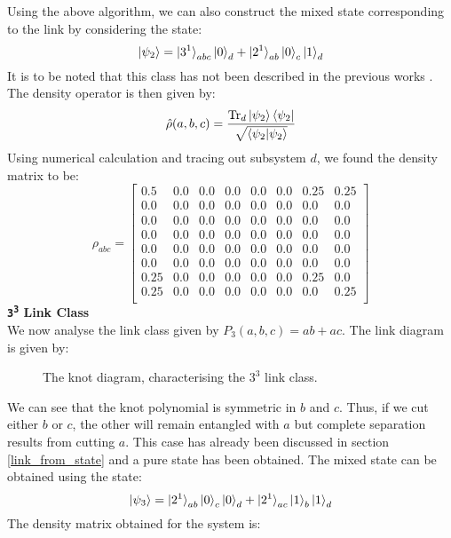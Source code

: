 \documentclass{scrartcl}
\begin{document}
Using the above algorithm, we can also construct the mixed state corresponding to the link by considering the state:
$$\ket{\psi_2} = \ket{3^1}_{abc}\ket{0}_d + \ket{2^1}_{ab}\ket{0}_c\ket{1}_d$$
It is to be noted that this class has not been described in the previous works \cite{Aravind1997,Sugita2007-ko}. The density operator is then given by:
$$\hat{\rho}(a,b,c) = \frac{\Tr_d\ket{\psi_2}\bra{\psi_2}}{\sqrt{\braket{\psi_2|\psi_2}}} $$
Using numerical calculation and tracing out subsystem $d$, we found the density matrix to be:
\begin{equation}
    \rho_{abc}=
    \left[
    \begin{array}{cccccccc}
    0.5 & 0.0 & 0.0 & 0.0 & 0.0 & 0.0 & 0.25 & 0.25 \\
    0.0 & 0.0 & 0.0 & 0.0 & 0.0 & 0.0 & 0.0 & 0.0 \\
    0.0 & 0.0 & 0.0 & 0.0 & 0.0 & 0.0 & 0.0 & 0.0 \\
    0.0 & 0.0 & 0.0 & 0.0 & 0.0 & 0.0 & 0.0 & 0.0 \\
    0.0 & 0.0 & 0.0 & 0.0 & 0.0 & 0.0 & 0.0 & 0.0 \\
    0.0 & 0.0 & 0.0 & 0.0 & 0.0 & 0.0 & 0.0 & 0.0 \\
    0.25 & 0.0 & 0.0 & 0.0 & 0.0 & 0.0 & 0.25 & 0.0 \\
    0.25 & 0.0 & 0.0 & 0.0 & 0.0 & 0.0 & 0.0 & 0.25 \\
    \end{array}
    \right]
    \end{equation}
\textbf{\large \texttt{3\textsuperscript{3}} Link Class} \\[0.3cm]
We now analyse the link class given by $P_3(a,b,c) = ab+ac$. The link diagram is given by:
\begin{figure}[H]
    \centering
    
  \caption{The knot diagram, characterising the $3^3$ link class.}
\end{figure}
\noindent
We can see that the knot polynomial is symmetric in $b$ and $c$. Thus, if we cut either $b$ or $c$, the other will remain entangled with $a$ but complete separation results from cutting $a$. This case has already been discussed in section \ref{link_from_state} and a pure state has been obtained. The mixed state can be obtained using the state:
$$\ket{\psi_3} = \ket{2^1}_{ab}\ket{0}_c\ket{0}_d + \ket{2^1}_{ac}\ket{1}_b\ket{1}_d  $$ 
The density matrix obtained for the system is: 
\end{document}
